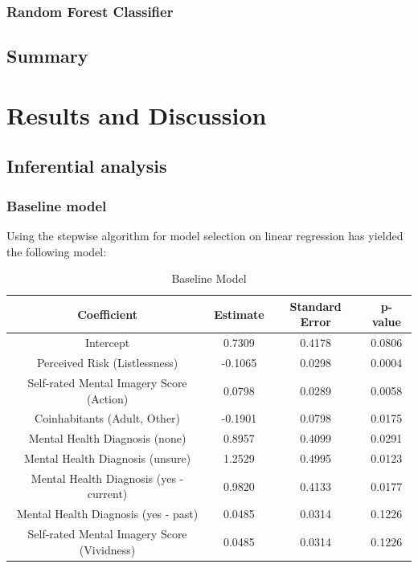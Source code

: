 \documentclass[12pt, a4paper]{article}
\begin{document}
\subsubsection{Random Forest Classifier}

\subsection{Summary}

\section{Results and Discussion}

\subsection{Inferential analysis}

\subsubsection{Baseline model}
Using the stepwise algorithm for model selection on linear regression has yielded the following model:

\begin{table}[ht]
\centering
\begin{tabular}{||c c c c||} 
 \hline
 Coefficient & Estimate & Standard Error & p-value \\ [0.5ex] 
 \hline\hline
 Intercept & 0.7309 & 0.4178 & 0.0806 \\ 
 Perceived Risk (Listlessness) & -0.1065 & 0.0298 & 0.0004 \\
 Self-rated Mental Imagery Score (Action)  & 0.0798 & 0.0289 & 0.0058 \\
 Coinhabitants (Adult, Other)\footnotemark & -0.1901 & 0.0798 & 0.0175 \\
 Mental Health Diagnosis (none) & 0.8957 & 0.4099 & 0.0291 \\ 
Mental Health Diagnosis (unsure) & 1.2529 & 0.4995 & 0.0123 \\
Mental Health Diagnosis (yes - current) & 0.9820 & 0.4133 & 0.0177 \\
Mental Health Diagnosis (yes - past) & 0.0485 & 0.0314 & 0.1226\\
 Self-rated Mental Imagery Score (Vividness)  & 0.0485 & 0.0314 & 0.1226 \\ [1ex] 
 \hline
\end{tabular}
\caption{Baseline Model}
\label{table:1}
\end{table}
\end{document}
